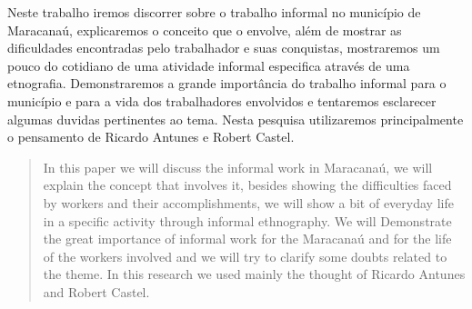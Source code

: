 \begin{resumo}
Neste trabalho iremos discorrer sobre o trabalho informal no município de Maracanaú, explicaremos o conceito que o envolve, além de mostrar as dificuldades encontradas pelo trabalhador e suas conquistas, mostraremos um pouco do cotidiano de uma atividade informal especifica através de uma etnografia. Demonstraremos a grande importância do trabalho informal para o município e para a vida dos trabalhadores envolvidos e tentaremos esclarecer algumas duvidas pertinentes ao tema. Nesta pesquisa utilizaremos principalmente o pensamento de Ricardo Antunes e Robert Castel.

\palavraschave
\end{resumo}
\pagebreak

\begin{abstract}
In this paper we will discuss the informal work in Maracanaú, we will explain the concept that involves it, besides showing the difficulties faced by workers and their accomplishments, we will show a bit of everyday life in a specific activity through informal ethnography. We will Demonstrate the great importance of informal work for the Maracanaú and for the life of the workers involved and we will try to clarify some doubts related to the theme. In this research we used mainly the thought of Ricardo Antunes and Robert Castel.

\keywords
\end{abstract}
